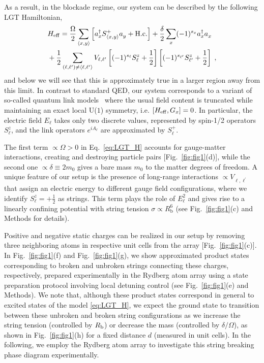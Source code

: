 \documentclass[footinbib,a4paper,aps,superscriptaddress,twocolumn,preprintnumbers,amsmath,amssymb,nobalancelastpage,10pt,prl]{revtex4-2}
\begin{document}
As a result, in the blockade regime, our system can be described by the following LGT Hamiltonian,
\begin{equation}
\label{eq:LGT_H}
\begin{aligned}
    &H_{\rm eff} = \frac{\Omega}{2} \sum_{\langle x,y\rangle} \left[a^\dagger_x S^+_{\langle x,y \rangle}a^{\vphantom{\dagger}}_y + \text{H.c.}\right] + \frac{\delta}{2}\sum_x (-1)^{s_x} a^\dagger_x a^{\vphantom{\dagger}}_x \\
    & + \frac{1}{2}\sum_{(\ell, \ell^\prime)\neq \langle\ell, \ell^\prime\rangle}V_{\ell,\ell^\prime}\left[(-1)^{s_\ell}S^z_\ell + \frac{1}{2}\right]\left[(-1)^{s_{\ell^\prime}}S^z_{\ell^\prime} + \frac{1}{2}\right] \;,
\end{aligned}
\end{equation}
and below we will see that this is approximately true in a larger region away from this limit.
In contrast to standard QED, our system corresponds to a variant of so-called quantum link models~\cite{Wiese_2013} where the usual field content is truncated while maintaining an exact local U($1$) symmetry, i.e. $\left[H_{\rm eff}, G_x\right] = 0$.  In particular, the electric field $E_\ell$ takes only two discrete values, represented by spin-1/2 operators $S^z_\ell$, and the link operators $e^{iA_\ell}$ are approximated by $S^+_\ell$. 

The first term $\propto \Omega>0$ in Eq.~\eqref{eq:LGT_H} accounts for gauge-matter interactions, creating and destroying particle pairs [Fig.~\ref{fig:fig1}(d)], while the second one $\propto \delta \equiv 2m_0$ gives a bare mass $m_0$ to the matter degrees of freedom. A unique feature of our setup is the presence of long-range interactions $\propto V_{\ell,\ell^\prime}$ that assign an electric energy to different gauge field configurations, where we identify $S^z_\ell = +\frac{1}{2}$ as strings. This term plays the role of $E_\ell^2$ and gives rise to a linearly confining potential with string tension $\sigma \propto R_\text{b}^6$ (see Fig.~\ref{fig:fig1}(c) and Methods for details).

Positive and negative static charges can be realized in our setup by removing three neighboring atoms in respective unit cells from the array [Fig.~\ref{fig:fig1}(c)].  In Fig.~\ref{fig:fig1}(f) and Fig.~\ref{fig:fig1}(g), we show approximated product states corresponding to broken and unbroken strings connecting these charges, respectively, prepared experimentally in the Rydberg atom array using a state preparation protocol involving local detuning control (see Fig.~\ref{fig:fig1}(e) and Methods). We note that, although these product states correspond in general to excited states of the model \eqref{eq:LGT_H}, we expect the ground state to transition between these unbroken and broken string configurations as we increase the string tension (controlled by $R_{\rm b}$) or decrease the mass (controlled by $\delta / \Omega$), as shown in Fig.~\ref{fig:fig1}(h) for a fixed distance $d$ (measured in unit cells). In the following, we employ the Rydberg atom array to investigate this string breaking phase diagram experimentally.
\end{document}
